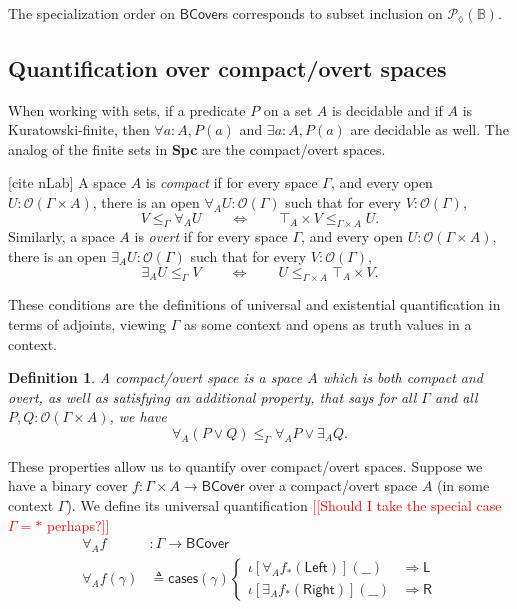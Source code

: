 \documentclass[conference]{IEEEtran}
\newtheorem{definition}{Definition}
\newcommand{\PLower}{\mathcal{P}_\lozenge}
\newcommand{\One}{\ast}
\newcommand{\Open}[1]{\mathcal{O}({#1})}
\newcommand{\bool}{\mathbb{B}}
\newcommand{\wildcard}{\_\_}
\newcommand{\oinclf}[1]{\iota[{#1}]}
\newcommand{\oincl}[2]{\oinclf{#1} \left({#2}\right)}
\newcommand{\Branch}{\Rightarrow}
\newcommand{\note}[1]{\textcolor{red}{[[{#1}]]}}
\begin{document}
The specialization order on $\mathsf{BCover}$s corresponds to subset inclusion on $\PLower(\bool)$.

\subsection{Quantification over compact/overt spaces}

When working with sets, if a predicate $P$ on a set $A$ is decidable and if $A$ is Kuratowski-finite, then $\forall a : A, P(a)$ and $\exists a : A, P(a)$ are decidable as well. The analog of the finite sets in \textbf{Spc} are the compact/overt spaces.

[cite nLab]
A space $A$ is \emph{compact} if for every space $\Gamma$, and every open $U : \Open{\Gamma \times A}$, there is an open $\forall_A U : \Open{\Gamma}$ such that for every $V : \Open{\Gamma},$
\[
V \le_\Gamma \forall_A U \qquad \Leftrightarrow \qquad \top_A \times V \le_{\Gamma \times A} U.
\]
Similarly, a space $A$ is \emph{overt} if for every space $\Gamma$, and every open $U : \Open{\Gamma \times A}$, there is an open $\exists_A U : \Open{\Gamma}$ such that for every $V : \Open{\Gamma},$
\[
\exists_A U \le_\Gamma V  \qquad \Leftrightarrow \qquad U  \le_{\Gamma \times A} \top_A \times V.
\]

These conditions are the definitions of universal and existential quantification in terms of adjoints, viewing $\Gamma$ as some context and opens as truth values in a context.

\begin{definition}
A \emph{compact/overt} space is a space $A$ which is both compact and overt, as well as satisfying an additional property, that says for all $\Gamma$ and all $P, Q : \Open{\Gamma \times A}$, we have
\[
\forall_A(P \vee Q) \le_\Gamma \forall_A P \vee \exists_A Q.
\]
\end{definition}
These properties allow us to quantify over compact/overt spaces. Suppose we have a binary cover $f : \Gamma \times A \to \mathsf{BCover}$ over a compact/overt space $A$ (in some context $\Gamma$). We define its universal quantification
\note{Should I take the special case $\Gamma = \One$ perhaps?}
\begin{align*}
\forall_A f &: \Gamma \to \mathsf{BCover}
\\ \forall_A f(\gamma) &\triangleq \mathsf{cases}(\mathsf{\gamma})
\begin{cases}
\oincl{\forall_A f_*(\mathsf{Left})}{\wildcard} &\Branch \mathsf{L}
\\ \oincl{\exists_A f_*(\mathsf{Right})}{\wildcard} &\Branch \mathsf{R}
\end{cases}
\end{align*}
\end{document}
